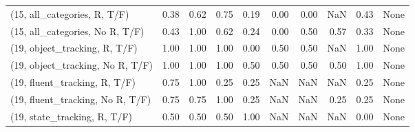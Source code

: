 \begin{table*}[h!]
\begin{adjustbox}{width=2\columnwidth,center}
\begin{tabular}{lrrr|rrr|rrr}
(15, all\_categories, R, T/F)          &                      0.38 &                  0.62 &                      0.75 &                          0.19 &                      0.00 &                          0.00 &                                    NaN &                               0.43 &                                  None \\
(15, all\_categories, No R, T/F)       &                      0.43 &                  1.00 &                      0.62 &                          0.24 &                      0.00 &                          0.50 &                                   0.57 &                               0.33 &                                  None \\



\midrule
(19, object\_tracking, R, T/F)         &                      1.00 &                  1.00 &                      1.00 &                          0.00 &                      0.50 &                          0.50 &                                    NaN &                               1.00 &                                  None \\
(19, object\_tracking, No R, T/F)      &                      1.00 &                  1.00 &                      1.00 &                          0.50 &                      0.50 &                          0.50 &                                   0.50 &                               1.00 &                                  None \\
(19, fluent\_tracking, R, T/F)         &                      0.75 &                  1.00 &                      0.25 &                          0.25 &                       NaN &                           NaN &                                    NaN &                               0.25 &                                  None \\
(19, fluent\_tracking, No R, T/F)      &                      0.75 &                  0.75 &                      1.00 &                          0.25 &                       NaN &                           NaN &                                   0.25 &                               0.25 &                                  None \\
(19, state\_tracking, R, T/F)          &                      0.50 &                  0.50 &                      0.50 &                          1.00 &                       NaN &                           NaN &                                    NaN &                               0.00 &                                  None \\

\end{tabular}
\end{adjustbox}
\end{table*}
